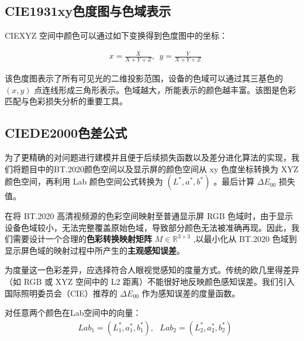 \subsection[\hspace{-2pt}CIE1931xy色度图与色域表示]{{\heiti{} \hspace{-8pt}CIE1931xy色度图与色域表示}}\label{section2: CIE1931xy色度图与色域表示}
CIEXYZ 空间中颜色可以通过如下变换得到色度图中的坐标：

\begin{equation}
\begin{aligned}
  &x=\frac{X}{X+Y+Z},\ \ y=\frac{Y}{X+Y+Z}
\end{aligned}
\end{equation}

该色度图表示了所有可见光的二维投影范围，设备的色域可以通过其三基色的 $(x,y)$ 点连线形成三角形表示。色域越大，所能表示的颜色越丰富。该图是色彩匹配与色彩损失分析的重要工具。

\subsection[\hspace{-2pt}CIEDE2000色差公式]{{\heiti{} \hspace{-8pt}CIEDE2000色差公式}}\label{section2: CIEDE2000色差公式}


为了更精确的对问题进行建模并且便于后续损失函数以及差分进化算法的实现，我们将题目中的BT.2020颜色空间以及显示屏的颜色空间从 xy 色度坐标转换为 XYZ 颜色空间，再利用 Lab 颜色空间公式转换为 $(L^{*},a^{*},b^{*})$ 。最后计算 $\Delta E_{00}$ 损失值。

在将 BT.2020 高清视频源的色彩空间映射至普通显示屏 RGB 色域时，由于显示设备色域较小，无法完整覆盖原始色域，导致部分颜色无法被准确再现。因此，我们需要设计一个合理的\textbf{色彩转换映射矩阵} $M\in \mathbb{R}^{3\times 3}$ ,以最小化从 BT.2020 色域到显示屏色域的映射过程中所产生的\textbf{主观感知误差}。

为度量这一色彩差异，应选择符合人眼视觉感知的度量方式。传统的欧几里得差异（如 RGB 或 XYZ 空间中的 L2 距离）不能很好地反映颜色感知误差。我们引入国际照明委员会（CIE）推荐的 $\Delta E_{00}$ 作为感知误差的度量函数。

对任意两个颜色在Lab空间中的向量：
\begin{equation}
\begin{aligned}
  &Lab_{1} = (L^{*}_{1},a^{*}_{1},b^{*}_{1}),\ \ \ Lab_{2}=(L^{*}_{2},a^{*}_{2},b^{*}_{2})
\end{aligned}
\end{equation}

